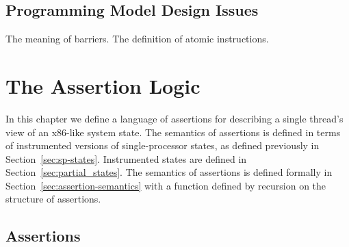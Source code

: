 \documentclass[11pt]{report}
\begin{document}
% 			
% 			
% 
% 			
% 			
% 			
% 						


\section{Programming Model Design Issues} %
\label{sec:programming_model_design_issues}

The meaning of barriers. The definition of atomic instructions. 


\chapter{The Assertion Logic}

In this chapter we define a language of assertions for describing a single thread's view of an x86-like system state. The semantics of assertions is defined in terms of instrumented versions of single-processor states, as defined previously in Section~\ref{sec:sp-states}. Instrumented states are defined in Section~\ref{sec:partial_states}. The semantics of assertions is defined formally in Section~\ref{sec:assertion-semantics} with a function defined by recursion on the structure of assertions.


\section{Assertions} %
\label{sec:assertions}
\end{document}
